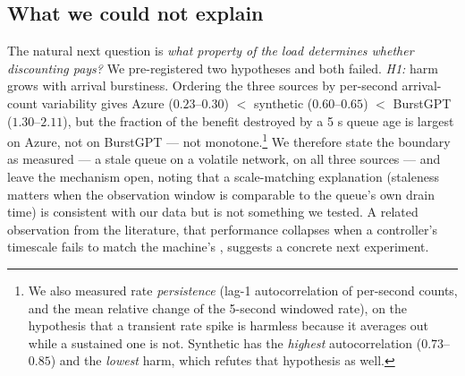 \subsection{What we could not explain}
The natural next question is \emph{what property of the load determines whether discounting
pays?} We pre-registered two hypotheses and both failed. \emph{H1:} harm grows with arrival
burstiness. Ordering the three sources by per-second arrival-count variability gives Azure
($0.23$--$0.30$) $<$ synthetic ($0.60$--$0.65$) $<$ BurstGPT ($1.30$--$2.11$), but the fraction
of the benefit destroyed by a 5 s queue age is largest on Azure, not on BurstGPT ---
not monotone.\footnote{We also measured rate \emph{persistence} (lag-1 autocorrelation of
per-second counts, and the mean relative change of the 5-second windowed rate), on the hypothesis
that a transient rate spike is harmless because it averages out while a sustained one is not.
Synthetic has the \emph{highest} autocorrelation ($0.73$--$0.85$) and the \emph{lowest} harm,
which refutes that hypothesis as well.} We therefore state the boundary as measured --- a stale
queue on a volatile network, on all three sources --- and leave the mechanism open, noting that
a scale-matching explanation (staleness matters when the observation window is comparable to the
queue's own drain time) is consistent with our data but is not something we tested. A related
observation from the literature, that performance collapses when a controller's timescale fails
to match the machine's \cite{dlfp}, suggests a concrete next experiment.

